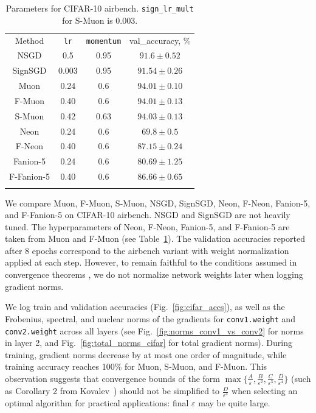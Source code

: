 \documentclass[smallextended,referee,envcountsect]{svjour3}
\renewcommand{\epsilon}{\varepsilon}
\newcommand{\figureref}[1]{Fig.~\ref{#1}}
\newcommand{\tableref}[1]{Table~\ref{#1}}
\begin{document}
 \begin{table}[htbp]
 
\caption{Parameters for CIFAR-10 airbench. \texttt{sign\_lr\_mult} for S-Muon is 0.003.}\label{tbl:cifar_lrs}
%
     \begin{tabular}{cccc}
       \arrayrulecolor{black}\toprule
       Method & \texttt{lr}  & \texttt{momentum}  & val\_accuracy, \% \\
       \arrayrulecolor{black}\hline
       NSGD & 0.5 & 0.95 & $91.6 \pm 0.52$ \\
       \hdashline
       SignSGD & 0.003 & 0.95 & $91.54 \pm 0.26$ \\
       \hdashline
       Muon & 0.24 & 0.6 & $94.01 \pm 0.10$ \\
       F-Muon & 0.40 & 0.6 & $94.01 \pm 0.13$\\
       \hdashline
       S-Muon & 0.42 & 0.63 & $94.03 \pm 0.13$ \\
       \hdashline
       Neon & 0.24 & 0.6 & $69.8 \pm 0.5$ \\
       F-Neon & 0.40 & 0.6 & $87.15 \pm 0.24$\\
       \hdashline
       Fanion-5 & 0.24 & 0.6 & $80.69 \pm 1.25$ \\
       F-Fanion-5 & 0.40 & 0.6 & $86.66 \pm 0.65$\\
       \arrayrulecolor{black}\bottomrule
     \end{tabular}%
   

 \end{table}
 
 We compare Muon, F-Muon, S-Muon, NSGD, SignSGD, Neon, F-Neon, Fanion-5, and F-Fanion-5 on CIFAR-10 airbench. NSGD and SignSGD are not heavily tuned. The hyperparameters of Neon, F-Neon, Fanion-5, and F-Fanion-5 are taken from Muon and F-Muon (see \tableref{tbl:cifar_lrs}). The validation accuracies reported after 8 epochs correspond to the airbench variant with weight normalization applied at each step. However, to remain faithful to the conditions assumed in convergence theorems \citep{kovalev2025understanding,riabinin2025gluon}, we do not normalize network weights later when logging gradient norms.
 
 We log train and validation accuracies (\figureref{fig:cifar_accs}), as well as the Frobenius, spectral, and nuclear norms of the gradients for \texttt{conv1.weight} and \texttt{conv2.weight} across all layers (see \figureref{fig:norms_conv1_vs_conv2} for norms in layer 2, and \figureref{fig:total_norms_cifar} for total gradient norms). During training, gradient norms decrease by at most one order of magnitude, while training accuracy reaches 100\% for Muon, S-Muon, and F-Muon. This observation suggests that convergence bounds of the form $\max\{\frac{A}{\epsilon}, \frac{B}{\epsilon^2}, \frac{C}{\epsilon^3}, \frac{D}{\epsilon^4}\}$ (such as Corollary 2 from Kovalev~\cite{kovalev2025understanding}) should not be simplified to $\frac{D}{\epsilon^4}$ when selecting an optimal algorithm for practical applications: final $\epsilon$ may be quite large.
 
\end{document}
